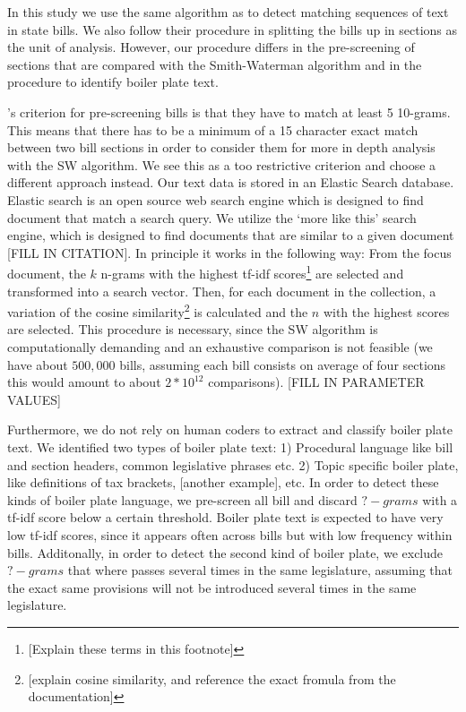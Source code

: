 \documentclass[12pt]{article} %
\begin{document}
In this study we use the same algorithm as \citet{wilkerson2015tracing} to detect matching sequences of text in state bills. We also follow their procedure in splitting the bills up in sections as the unit of analysis. However, our procedure differs in the pre-screening of sections that are compared with the Smith-Waterman algorithm and in the procedure to identify boiler plate text.

\citet{wilkerson2015tracing}'s criterion for pre-screening bills is that they have to match at least 5 10-grams. This means that there has to be a minimum of a 15 character exact match between two bill sections in order to consider them for more in depth analysis with the SW algorithm. We see this as a too restrictive criterion and choose a different approach instead. Our text data is stored in an Elastic Search database. Elastic search is an open source web search engine which is designed to find document that match a search query. We utilize the `more like this' search engine, which is designed to find documents that are similar to a given document [FILL IN CITATION]. In principle it works in the following way: From the focus document, the $k$ n-grams with the highest tf-idf scores\footnote{[Explain these terms in this footnote]} are selected and transformed into a search vector. Then, for each document in the collection, a variation of the cosine similarity\footnote{[explain cosine similarity, and reference the exact fromula from the documentation]} is calculated and the $n$ with the highest scores are selected. This procedure is necessary, since the SW algorithm is computationally demanding and an exhaustive comparison is not feasible (we have about $500,000$ bills, assuming each bill consists on average of four sections this would amount to about $2 * 10^{12}$ comparisons). [FILL IN PARAMETER VALUES]

Furthermore, we do not rely on human coders to extract and classify boiler plate text. We identified two types of boiler plate text: 1) Procedural language like bill and section headers, common legislative phrases etc. 2) Topic specific boiler plate, like definitions of tax brackets, [another example], etc. In order to detect these kinds of boiler plate language, we pre-screen all bill and discard $?-grams$ with a tf-idf score below a certain threshold. Boiler plate text is expected to have very low tf-idf scores, since it appears often across bills but with low frequency within bills. Additonally, in order to detect the second kind of boiler plate, we exclude $?-grams$ that where passes several times in the same legislature, assuming that the exact same provisions will not be introduced several times in the same legislature.
\end{document}
